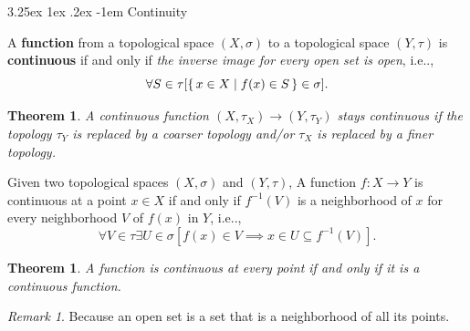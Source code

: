 \documentclass[12pt, letterpaper]{article}
\makeatletter
\renewcommand\subparagraph{\@startsection{subparagraph}{5}{\parindent}%
	{3.25ex \@plus1ex \@minus .2ex}%
	{0.75ex plus 0.1ex}%
	{\normalfont\normalsize\bfseries}}
\newcommand{\calS}{\mathcal{S}}
\newcommand\ie{i.e\@ifnextchar.{}{.\@}}
\newtheorem{thm}[prop]{Theorem}
\renewcommand\subparagraph{\@startsection{subparagraph}{5}{\parindent}%
	{3.25ex \@plus1ex \@minus .2ex}%
	{-1em}%
	{\normalfont\normalsize\bfseries}}
\theoremstyle{definition}
\theoremstyle{remark}
\newtheorem*{rem*}{Remark}
\theoremstyle{definition}
\theoremstyle{plain}
\numberwithin{equation}{section}
\makeatother
\begin{document}
	\subparagraph{Continuity}
	\begin{def*}
		A \textbf{function} from a topological space $(X,\sigma)$ to a topological space $(Y,\tau)$
		is \textbf{continuous} if and only if \textit{the inverse image for every open set is open}, \ie,
		\[\forall S\in\tau[\set{x\in X|f(x)\in S}\in\sigma]. \]
	\end{def*}
	\begin{thm}
		A continuous function
		$\left(X,\tau _{X}\right)\to \left(Y,\tau _{Y}\right)$
		stays continuous if the topology $\tau _{Y}$ is replaced by a coarser topology and/or $\tau _{X}$ is replaced by a finer topology.
	\end{thm}
	\begin{def*}
		Given two topological spaces $(X,\sigma)$ and $(Y,\tau)$,
		A function $f\colon X\to Y$ is continuous at a point $x\in X$
		if and only if $f^{{-1}}(V)$ is a neighborhood of $x$ for every neighborhood $V$ of $f(x)$ in $Y$,
		\ie,
		\[ \forall V\in\tau\exists U\in\sigma[f(x)\in V \implies x\in U\subseteq f^{-1}(V) ] .\]
	\end{def*}
	\begin{thm}
		A function is continuous at every point if and only if it is a continuous function.
	\end{thm}
	\begin{rem*}
		Because an open set is a set that is a neighborhood of all its points.
	\end{rem*}
\end{document}
